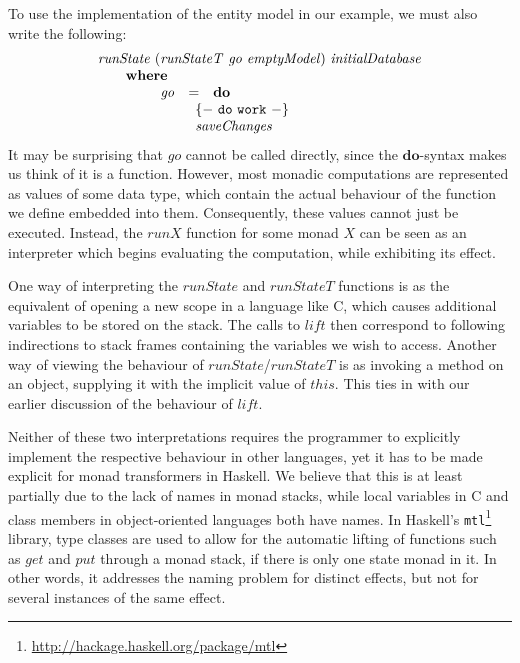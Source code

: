 To use the implementation of the entity model in our example, we must also write the following:
\begin{displaymath}
\begin{array}{l}
\mathit{runState}~(\mathit{runStateT}~\mathit{go}~\mathit{emptyModel})~\mathit{initialDatabase} \\
\qquad \mathbf{where} \\
\qquad \qquad \begin{array}{lcl}
\mathit{go} & = & \mathbf{do} \\
\multicolumn{3}{l}{\qquad \begin{array}{l}
\mathtt{\{-~do~work~-\}}\\
\mathit{saveChanges}
\end{array}} 
\end{array}
\end{array}
\end{displaymath}
It may be surprising that $\mathit{go}$ cannot be called directly, since the $\mathbf{do}$-syntax makes us think of it is a function. However, most monadic computations are represented as values of some data type, which contain the actual behaviour of the function we define embedded into them. Consequently, these values cannot just be executed. Instead, the $\mathit{runX}$ function for some monad $X$ can be seen as an interpreter which begins evaluating the computation, while exhibiting its effect.

One way of interpreting the $\mathit{runState}$ and $\mathit{runStateT}$ functions is as the equivalent of opening a new scope in a language like C, which causes additional variables to be stored on the stack. The calls to $\mathit{lift}$ then correspond to following indirections to stack frames containing the variables we wish to access. Another way of viewing the behaviour of $\mathit{runState}$/$\mathit{runStateT}$ is as invoking a method on an object, supplying it with the implicit value of $\mathit{this}$. This ties in with our earlier discussion of the behaviour of $\mathit{lift}$.

Neither of these two interpretations requires the programmer to explicitly implement the respective behaviour in other languages, yet it has to be made explicit for monad transformers in Haskell. We believe that this is at least partially due to the lack of names in monad stacks, while local variables in C and class members in object-oriented languages both have names. In Haskell's \texttt{mtl}\footnote{\url{http://hackage.haskell.org/package/mtl}} library, type classes are used to allow for the automatic lifting of functions such as $\mathit{get}$ and $\mathit{put}$ through a monad stack, if there is only one state monad in it. In other words, it addresses the naming problem for distinct effects, but not for several instances of the same effect.

